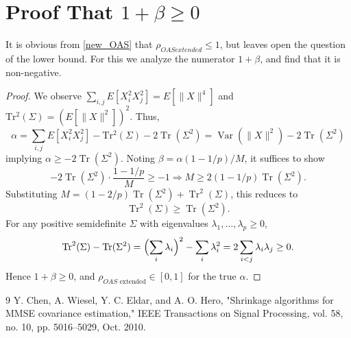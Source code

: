 \documentclass[10pt,twoside,titlepage]{article}   %
\begin{document}
\section{Proof That $1 + \beta \geq 0$}
\label{app:proof}
It is obvious from \eqref{new_OAS} that $\rho_{OAS extended} \leq 1$, but leaves open the question of the lower bound.
For this we analyze the numerator $1 + \beta$, and find that it is non-negative.
\begin{proof}
We observe
$\sum_{i,j} E \left[ X_i^2  X_j^2 \right] = E \left[ \lVert X \rVert^4 \right]$ and
$\operatorname{Tr^2}(\Sigma) = \left( E \left[ \lVert X \rVert^2 \right] \right)^2$.
Thus,
\[
\alpha = \sum_{i,j} E \left[ X_i^2  X_j^2 \right] - \operatorname{Tr^2}(\Sigma) - 2 \operatorname{Tr}(\Sigma^2) = \operatorname{Var} \left(  \lVert X \rVert^2 \right) - 2 \operatorname{Tr}(\Sigma^2)
\]
implying $\alpha \geq - 2 \operatorname{Tr}(\Sigma^2)$.
Noting $\beta = \alpha(1-1/p)/M$, it suffices to show
\[
-2\operatorname{Tr}(\Sigma^2) \cdot \frac{1-1/p}{M} \geq -1 \Rightarrow M \geq 2(1-1/p)\operatorname{Tr}(\Sigma^2).
\]
Substituting $M = (1-2/p)\operatorname{Tr}(\Sigma^2) + \operatorname{Tr}^2(\Sigma)$, this reduces to
\[
\operatorname{Tr}^2(\Sigma) \geq \operatorname{Tr}(\Sigma^2).
\]
For any positive semidefinite $\Sigma$ with eigenvalues $\lambda_1, \ldots, \lambda_p \geq 0$,
\[
\operatorname{Tr}^2(\Sigma) - \operatorname{Tr}(\Sigma^2)
= \Bigl(\sum_i \lambda_i\Bigr)^2 - \sum_i \lambda_i^2
= 2\sum_{i < j} \lambda_i \lambda_j \geq 0.
\]
Hence $1 + \beta \geq 0$, and $\rho_{OAS\text{ extended}} \in [0,1]$ for the true $\alpha$.
\end{proof}

\begin{thebibliography}{9}
Y. Chen, A. Wiesel, Y. C. Eldar, and A. O. Hero, "Shrinkage algorithms for MMSE covariance estimation," 
IEEE Transactions on Signal Processing, vol. 58, no. 10, pp. 5016–5029, Oct. 2010.
\end{thebibliography}
\end{document}
